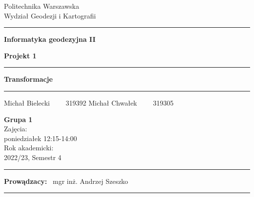 \documentclass[a4paper,12pt]{article}
\begin{document}
	
	\begin{titlepage}
		
		\begin{center}
			Politechnika Warszawska \\
			Wydział Geodezji i Kartografii
		\end{center}
		
		\hrule
		\vspace*{1cm}
		\begin{center}
			\Large{\textbf{Informatyka geodezyjna II}}
		\end{center}
		
		
		\vspace*{2cm}
		\begin{center}
			\large{\textbf{Projekt 1}} 
		\end{center}
		\vspace{3cm}
		\hrule
		
		\begin{center}
			\Large{\textbf{Transformacje}}
		\end{center}
		\hrule
		
		\vspace*{2cm}
		\begin{center}
			\large{Michał Bielecki \ \ \ \ 319392} 
			\large{Michał Chwałek \ \ \ \ 319305} 
		\end{center}
		
		\vspace*{3cm}
		
		\begin{center}
			\normalsize{\textbf{Grupa 1}}\\
			\small{Zajęcia: \\poniedziałek 12:15-14:00} \\
			\small{Rok akademicki:\\ 2022/23, Semestr 4}
		\end{center}
		
		\vspace*{3cm}
		\hrule
		\begin{center}
			\large{\textbf{Prowądzacy:} \ mgr inż. Andrzej Szeszko}
		\end{center}
		\hrule
		
		
	\end{titlepage}


	
\end{document}
